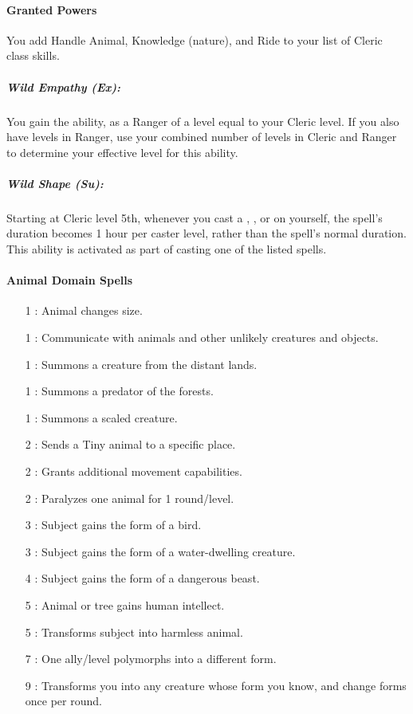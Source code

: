 \paragraph{Granted Powers}
You add Handle Animal, Knowledge (nature), and Ride to your list of Cleric class skills.
\subparagraph{Wild Empathy (Ex):}
You gain the  ability, as a Ranger of a level equal to your Cleric level.
If you also have levels in Ranger, use your combined number of levels in Cleric and Ranger to determine your effective level for this ability.
\subparagraph[Wild Shape]{Wild Shape (Su):}
\label{sec:WildShape}
Starting at Cleric level 5th, whenever you cast a , , 
 or  on yourself, 
the spell's duration becomes 1 hour per caster level, rather than the spell's normal duration.
This ability is activated as part of casting one of the listed spells.
\paragraph{Animal Domain Spells}
\begin{itemize}
\item[1] : Animal changes size.
\item[1] : Communicate with animals and other unlikely creatures and objects.
\item[1] : Summons a creature from the distant lands.
\item[1] : Summons a predator of the forests.
\item[1] : Summons a scaled creature.
\item[2] : Sends a Tiny animal to a specific place.
\item[2] : Grants additional movement capabilities.
\item[2] : Paralyzes one animal for 1 round/level.
\item[3] : Subject gains the form of a bird.
\item[3] : Subject gains the form of a water-dwelling creature.
\item[4] : Subject gains the form of a dangerous beast.
\item[5] : Animal or tree gains human intellect.
\item[5] : Transforms subject into harmless animal.
\item[7] : One ally/level polymorphs into a different form.
\item[9] : Transforms you into any creature whose form you know, and change forms once per round.
\end{itemize}
